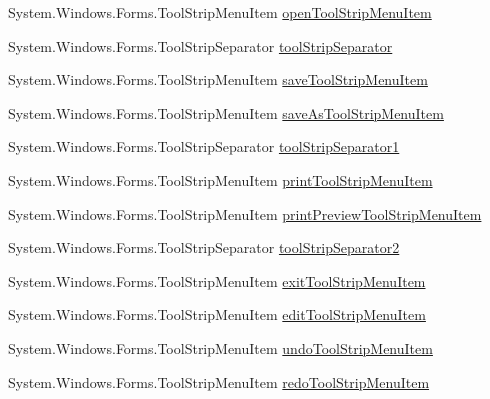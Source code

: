 \begin{DoxyCompactItemize}
\item 
\-System.\-Windows.\-Forms.\-Tool\-Strip\-Menu\-Item \hyperlink{class_sr_p___classroom_inq_1_1frm_classrrom_inq_aabb3ca13577ddb31c75bcd459c075263}{open\-Tool\-Strip\-Menu\-Item}
\item 
\-System.\-Windows.\-Forms.\-Tool\-Strip\-Separator \hyperlink{class_sr_p___classroom_inq_1_1frm_classrrom_inq_a442caa4a21bb4dac8b91d82e24bec584}{tool\-Strip\-Separator}
\item 
\-System.\-Windows.\-Forms.\-Tool\-Strip\-Menu\-Item \hyperlink{class_sr_p___classroom_inq_1_1frm_classrrom_inq_a7e580a014ae78cc9e8d2ce621a2541f3}{save\-Tool\-Strip\-Menu\-Item}
\item 
\-System.\-Windows.\-Forms.\-Tool\-Strip\-Menu\-Item \hyperlink{class_sr_p___classroom_inq_1_1frm_classrrom_inq_a660ffe654aa61a06b147d2220fc5c75d}{save\-As\-Tool\-Strip\-Menu\-Item}
\item 
\-System.\-Windows.\-Forms.\-Tool\-Strip\-Separator \hyperlink{class_sr_p___classroom_inq_1_1frm_classrrom_inq_a3bec3b534d141382d4525a9be840e911}{tool\-Strip\-Separator1}
\item 
\-System.\-Windows.\-Forms.\-Tool\-Strip\-Menu\-Item \hyperlink{class_sr_p___classroom_inq_1_1frm_classrrom_inq_ab2355ecf8174002162a103a7e7ee83f4}{print\-Tool\-Strip\-Menu\-Item}
\item 
\-System.\-Windows.\-Forms.\-Tool\-Strip\-Menu\-Item \hyperlink{class_sr_p___classroom_inq_1_1frm_classrrom_inq_a56c14d36b467c4787937369037c22717}{print\-Preview\-Tool\-Strip\-Menu\-Item}
\item 
\-System.\-Windows.\-Forms.\-Tool\-Strip\-Separator \hyperlink{class_sr_p___classroom_inq_1_1frm_classrrom_inq_aa51d7952b4dde9caa9d7e111353a2047}{tool\-Strip\-Separator2}
\item 
\-System.\-Windows.\-Forms.\-Tool\-Strip\-Menu\-Item \hyperlink{class_sr_p___classroom_inq_1_1frm_classrrom_inq_a676112a698472361a000699f774d38ca}{exit\-Tool\-Strip\-Menu\-Item}
\item 
\-System.\-Windows.\-Forms.\-Tool\-Strip\-Menu\-Item \hyperlink{class_sr_p___classroom_inq_1_1frm_classrrom_inq_a3e1d074025f88cab6f1911c123de6abb}{edit\-Tool\-Strip\-Menu\-Item}
\item 
\-System.\-Windows.\-Forms.\-Tool\-Strip\-Menu\-Item \hyperlink{class_sr_p___classroom_inq_1_1frm_classrrom_inq_a8163a2e440678bc9508520209879805e}{undo\-Tool\-Strip\-Menu\-Item}
\item 
\-System.\-Windows.\-Forms.\-Tool\-Strip\-Menu\-Item \hyperlink{class_sr_p___classroom_inq_1_1frm_classrrom_inq_a1b4d7ae0d344dc1fda1561a1d652fa6c}{redo\-Tool\-Strip\-Menu\-Item}

\end{DoxyCompactItemize}
